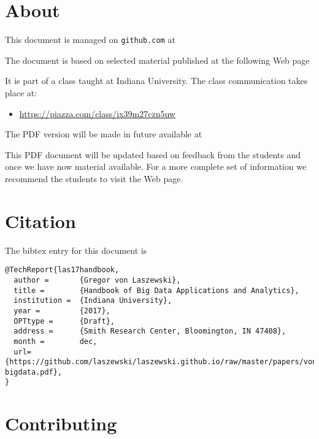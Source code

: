 \FILENAME

\section{About}\label{about}

This document is managed on \verb|github.com| at 


The document is based on selected material published at the following
Web page



It is part of a class taught at Indiana University. The class
communication takes place at:

\begin{itemize}
\item
  \url{https://piazza.com/class/ix39m27czn5uw}
\end{itemize}

The PDF version will be made in future available at 


This PDF document will be updated based on feedback from the students
and once we have now material available. For a more complete set of
information we recommend the students to visit the Web page.

\section{Citation}

The bibtex entry for this document is

\begin{verbatim}
@TechReport{las17handbook,
  author =       {Gregor von Laszewski},
  title =        {Handbook of Big Data Applications and Analytics},
  institution =  {Indiana University},
  year =         {2017},
  OPTtype =      {Draft},
  address =      {Smith Research Center, Bloomington, IN 47408},
  month =        dec,
  url={https://github.com/laszewski/laszewski.github.io/raw/master/papers/vonLaszewski-bigdata.pdf},
}
\end{verbatim}

\section{Contributing}

